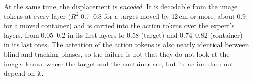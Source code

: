 At the same time, the displacement is \emph{encoded}.
It is decodable from the image tokens at every layer ($R^2$ 0.7--0.8 for a target moved by 12\,cm or more, about 0.9 for a
moved container) and is carried into the action tokens over the expert's layers, from 0.05--0.2 in its first layers to
0.58 (target) and 0.74--0.82 (container) in its last ones.
The attention of the action tokens is also nearly identical between blind and tracking phases, so the failure is not that
they do not look at the image: \pizf knows where the target and the container are, but its action does not depend on it.
